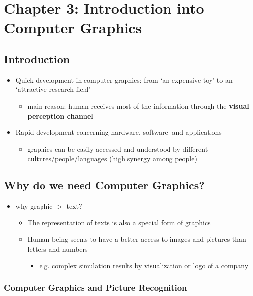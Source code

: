 \documentclass{standalone}
\begin{document}
\section{Chapter 3: Introduction into Computer Graphics}

\subsection{Introduction}

\begin{itemize}
	\item Quick development in computer graphics: from `an expensive toy' to an `attractive research field'
		\begin{itemize}
			\item main reason: human receives most of the information through the \textbf{visual perception channel}
			\end{itemize}
	\item Rapid development concerning hardware, software, and applications
		\begin{itemize}
			\item graphics can be easily accessed and understood by different cultures/people/languages (high synergy among people)
		\end{itemize}
\end{itemize}

\subsection{Why do we need Computer Graphics?}

\begin{itemize}
	\item why graphic $>$ text?
		\begin{itemize}
			\item The representation of texts is also a special form of graphics
			\item Human being seems to have a better access to images and pictures than letters and numbers
				\begin{itemize}
					\item e.g. complex simulation results by visualization or logo of a company
				\end{itemize}
		\end{itemize}
\end{itemize}

\subsubsection{Computer Graphics and Picture Recognition}
\end{document}

